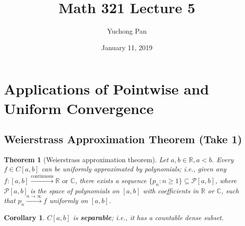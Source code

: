 \documentclass[letterpaper, reqno,11pt]{article}
\newcommand{\RR}{\mathbb{R}}
\newcommand{\CC}{\mathbb{C}}
\begin{document}
\title{Math 321 Lecture 5}
\author{Yuchong Pan}
\date{January 11, 2019}
\newtheorem{thm}{Theorem}
\newtheorem{defn}{Definition}
\newtheorem{exs}{Exercise}
\newtheorem{remark}{Remark}
\newtheorem{claim}{Claim}
\newtheorem{cor}{Corollary}
\maketitle
%

\section{Applications of Pointwise and Uniform Convergence}

\subsection{Weierstrass Approximation Theorem (Take 1)}

\begin{thm}[Weierstrass approximation theorem] \label{thm:1}
  \normalfont Let $a, b \in \RR, a < b$. Every $f \in C[a, b]$ can be uniformly approximated by polynomials; i.e., given any $f : [a, b] \xrightarrow{\text{continuous}} \RR \text{ or } \CC$, there exists a sequence $\{ p_n : n \geq 1 \} \subseteq \mathcal P[a, b]$, where $\mathcal P[a, b]$ is the space of polynomials on $[a, b]$ with coefficients in $\RR$ or $\CC$, such that $p_n \xrightarrow{n \to \infty} f$ uniformly on $[a, b]$.
\end{thm}

\begin{cor}
  \normalfont $C[a, b]$ is {\bf separable}; i.e., it has a countable dense subset.
\end{cor}
\end{document}
